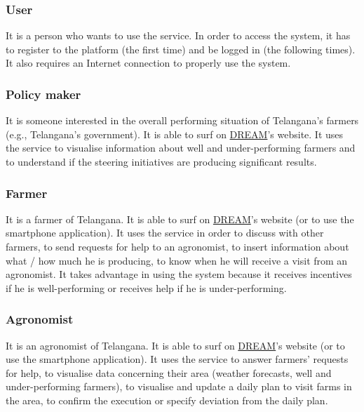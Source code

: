 \subsubsection{User}
It is a person who wants to use the service. In order to access the system, it has to register to the platform (the first time) and be logged in (the following times). It also requires an Internet connection to properly use the system.
\subsubsection{Policy maker}
It is someone interested in the overall performing situation of Telangana’s farmers (e.g., Telangana’s government). It is able to surf on \hyperref[tab:acronymsTable]{DREAM}’s website. It uses the service to visualise information about well and under-performing farmers and to understand if the steering initiatives are producing significant results.
\subsubsection{Farmer}
It is a farmer of Telangana. It is able to surf on \hyperref[tab:acronymsTable]{DREAM}’s website (or to use the smartphone application). It uses the service in order to discuss with other farmers, to send requests for help to an agronomist, to insert information about what / how much he is producing, to know when he will receive a visit from an agronomist. It takes advantage in using the system because it receives incentives if he is well-performing or receives help if he is under-performing.
\subsubsection{Agronomist}
It is an agronomist of Telangana. It is able to surf on \hyperref[tab:acronymsTable]{DREAM}’s website (or to use the smartphone application). It uses the service to answer farmers' requests for help, to visualise data concerning their area (weather forecasts, well and under-performing farmers), to visualise and update a daily plan to visit farms in the area, to confirm the execution or specify deviation from the daily plan.


